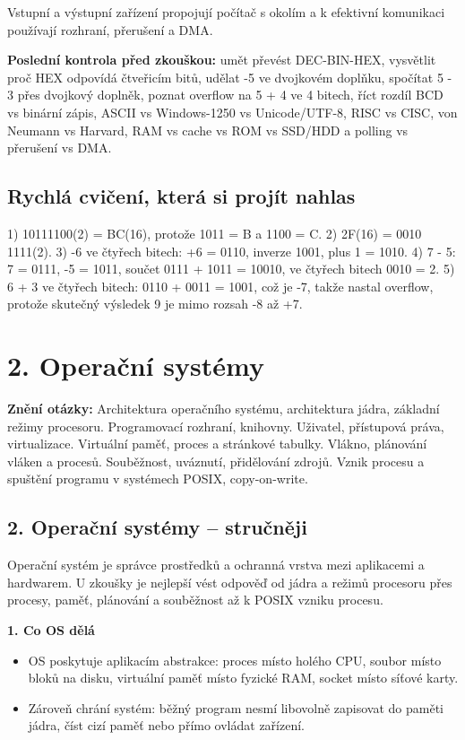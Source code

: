 \documentclass[11pt,a4paper]{article}
\newcommand{\otazka}[3]{\section*{#1}\addcontentsline{toc}{section}{#1}\noindent\textbf{Znění otázky:} #2\par\medskip}
\newcommand{\itzk}[1]{\medskip\noindent\colorbox{blue!7}{\parbox{\dimexpr\linewidth-2\fboxsep}{#1}}\medskip}
\begin{document}
Vstupní a výstupní zařízení propojují počítač s okolím a k efektivní komunikaci používají rozhraní, přerušení a DMA.

\itzk{\textbf{Poslední kontrola před zkouškou:} umět převést DEC-BIN-HEX, vysvětlit proč HEX odpovídá čtveřicím bitů, udělat -5 ve dvojkovém doplňku, spočítat 5 - 3 přes dvojkový doplněk, poznat overflow na 5 + 4 ve 4 bitech, říct rozdíl BCD vs binární zápis, ASCII vs Windows-1250 vs Unicode/UTF-8, RISC vs CISC, von Neumann vs Harvard, RAM vs cache vs ROM vs SSD/HDD a polling vs přerušení vs DMA.}

\subsection*{Rychlá cvičení, která si projít nahlas}

1) 10111100(2) = BC(16), protože 1011 = B a 1100 = C. 2) 2F(16) = 0010 1111(2). 3) -6 ve čtyřech bitech: +6 = 0110, inverze 1001, plus 1 = 1010. 4) 7 - 5: 7 = 0111, -5 = 1011, součet 0111 + 1011 = 10010, ve čtyřech bitech 0010 = 2. 5) 6 + 3 ve čtyřech bitech: 0110 + 0011 = 1001, což je -7, takže nastal overflow, protože skutečný výsledek 9 je mimo rozsah -8 až +7.

\newpage

\otazka{2. Operační systémy}{Architektura operačního systému, architektura jádra, základní režimy procesoru. Programovací rozhraní, knihovny. Uživatel, přístupová práva, virtualizace. Virtuální paměť, proces a stránkové tabulky. Vlákno, plánování vláken a procesů. Souběžnost, uváznutí, přidělování zdrojů. Vznik procesu a spuštění programu v systémech POSIX, copy-on-write.}{PB152, PV004}

\subsection*{2. Operační systémy -- stručněji}
Operační systém je správce prostředků a ochranná vrstva mezi aplikacemi a hardwarem. U zkoušky je nejlepší vést odpověď od jádra a režimů procesoru přes procesy, paměť, plánování a souběžnost až k POSIX vzniku procesu.

\textbf{1. Co OS dělá}
\begin{itemize}
  \item OS poskytuje aplikacím abstrakce: proces místo holého CPU, soubor místo bloků na disku, virtuální paměť místo fyzické RAM, socket místo síťové karty.
  \item Zároveň chrání systém: běžný program nesmí libovolně zapisovat do paměti jádra, číst cizí paměť nebo přímo ovládat zařízení.
\end{itemize}
\end{document}
